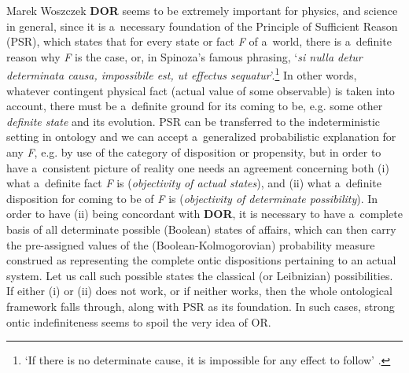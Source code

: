 \begin{artengenv}{Marek Woszczek}
\textbf{DOR} seems to be extremely important for physics, and science in general, since it is a~necessary foundation of the Principle of Sufficient Reason (PSR), which states that for every state or fact \textit{F} of a~world, there is a~definite reason why \textit{F} is the case, or, in Spinoza's famous phrasing, ‘\textit{si nulla detur determinata causa, impossibile est, ut effectus sequatur}'.\footnote{‘If there is no determinate cause, it is impossible for any effect to follow'
\parencite[Spinoza, \textit{Ethics}, I, Ax. III][p.6]{spinoza_ethik_1977}.%
} In other words, whatever contingent physical fact (actual value of some observable) is taken into account, there must be a~definite ground for its coming to be, e.g. some other \textit{definite state} and its evolution. PSR can be transferred to the indeterministic setting in ontology and we can accept a~generalized probabilistic explanation for any \textit{F}, e.g. by use of the category of disposition or propensity, but in order to have a~consistent picture of reality one needs an agreement concerning both (i) what a~definite fact \textit{F} is (\textit{objectivity of actual states}), and (ii) what a~definite disposition for coming to be of \textit{F} is (\textit{objectivity of determinate possibility}). In order to have (ii) being concordant with \textbf{DOR}, it is necessary to have a~complete basis of all determinate possible (Boolean) states of affairs, which can then carry the pre-assigned values of the (Boolean-Kolmogorovian) probability measure construed as representing the complete ontic dispositions pertaining to an actual system. Let us call such possible states the classical (or Leibnizian) possibilities. If either (i) or (ii) does not work, or if neither works, then the whole ontological framework falls through, along with PSR as its foundation. In such cases, strong ontic indefiniteness seems to spoil the very idea of OR.


\end{artengenv}
